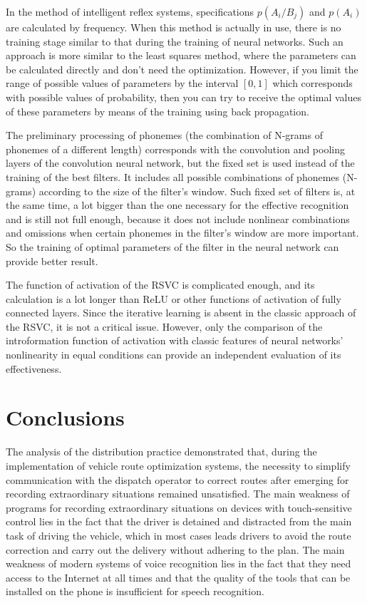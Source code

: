 In the method of intelligent reflex systems, specifications $p(A_i/B_j)$ and $p(A_i)$ are calculated by frequency. When this method is actually in use, there is no training stage similar to that during the training of neural networks. Such an approach is more similar to the least squares method, where the parameters can be calculated directly and don’t need the optimization. 
However, if you limit the range of possible values of parameters by the interval $[0, 1]$ which corresponds with possible values of probability, then you can try to receive the optimal values of these parameters by means of the training using back propagation. 

The preliminary processing of phonemes (the combination of N-grams of phonemes of a different length) corresponds with the convolution and pooling layers of the convolution neural network, but the fixed set is used instead of the training of the best filters. It includes all possible combinations of phonemes (N-grams) according to the size of the filter’s window. Such fixed set of filters is, at the same time, a lot bigger than the one necessary for the effective recognition and is still not full enough, because it does not include nonlinear combinations and omissions when certain phonemes in the filter’s window are more important. So the training of optimal parameters of the filter in the neural network can provide better result. 

The function of activation of the RSVC is complicated enough, and its calculation is a lot longer than ReLU or other functions of activation of fully connected layers. Since the iterative learning is absent in the classic approach of the RSVC, it is not a critical issue. However, only the comparison of the introformation function of activation with classic features of neural networks’ nonlinearity in equal conditions can provide an independent evaluation of its effectiveness. 

\section{Conclusions}

The analysis of the distribution practice demonstrated that, during the implementation of vehicle route optimization systems, the necessity to simplify communication with the dispatch operator to correct routes after emerging for recording extraordinary situations remained unsatisfied. The main weakness of programs for recording extraordinary situations on devices with touch-sensitive control lies in the fact that the driver is detained and distracted from the main task of driving the vehicle, which in most cases leads drivers to avoid the route correction and carry out the delivery without adhering to the plan. The main weakness of modern systems of voice recognition lies in the fact that they need access to the Internet at all times and that the quality of the tools that can be installed on the phone is insufficient for speech recognition. 

